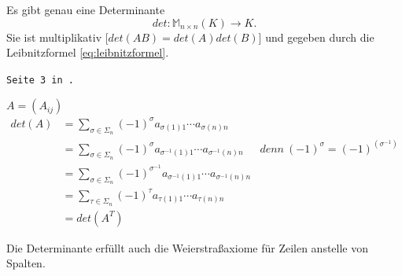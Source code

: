 \documentclass[9pt]{article} %
\begin{document}
\begin{satz}
 Es gibt genau eine Determinante 
 \[
 det: \mathbb{M}_{n \times n}(K) \rightarrow K.
 \]
 Sie ist multiplikativ [$det(AB) = det(A)det(B)$] und gegeben durch die Leibnitzformel \ref{eq:leibnitzformel}.
\end{satz}

\begin{bsp}
 \texttt{Seite 3 in \cite{vor3}.}
\end{bsp}

\begin{beob}
\(A = (A_{ij})\)
\begin{align*}
    det(A) &= \sum_{\sigma \in \Sigma_n} (-1)^{\sigma} a_{\sigma(1) 1} \cdots a_{\sigma(n) n}  \\
    &= \sum_{\sigma \in \Sigma_n} (-1)^{\sigma} a_{\sigma^{-1}(1) 1} \cdots a_{\sigma^{-1}(n) n}  & denn \ (-1)^{\sigma}  = (-1)^{(\sigma^{-1})}  \\
    &= \sum_{\sigma \in \Sigma_n} (-1)^{\sigma^{-1}} a_{\sigma^{-1}(1) 1} \cdots a_{\sigma^{-1}(n) n} \\
    &= \sum_{\tau \in \Sigma_n} (-1)^{\tau} a_{\tau(1) 1} \cdots a_{\tau(n) n} \\
    &= det(A^T)
\end{align*}
\end{beob}

\begin{kor}
Die Determinante erfüllt auch die Weierstraßaxiome für Zeilen anstelle von Spalten.  
\end{kor}
\end{document}
